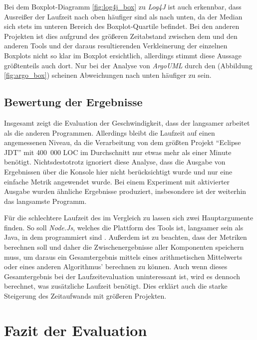 Bei dem Boxplot-Diagramm \ref{fig:log4j_box} zu \textit{Log4J} ist auch erkennbar, dass Ausreißer der Laufzeit nach oben häufiger sind als nach unten, da der Median sich stets im unteren Bereich des Boxplot-Quartile befindet. Bei den anderen Projekten ist dies aufgrund des größeren Zeitabstand  zwischen dem \doceval und den anderen Tools  und der daraus resultierenden Verkleinerung der einzelnen Boxplots  nicht so klar im Boxplot ersichtlich, allerdings stimmt diese Aussage größtenteils auch dort. Nur bei der Analyse von \textit{ArgoUML} durch den \doceval (Abbildung \ref{fig:argo_box}) scheinen Abweichungen nach unten häufiger zu sein.

\subsection{Bewertung der Ergebnisse}
Insgesamt zeigt die Evaluation der Geschwindigkeit, dass der \doceval langsamer arbeitet als die anderen Programmen. Allerdings  bleibt die Laufzeit auf einen angemessenen Niveau, da die Verarbeitung von dem größten Projekt \enquote{Eclipse \ac{JDT}} mit 400~000 \ac{LOC} im Durchschnitt nur etwas mehr als einer Minute benötigt. Nichtsdestotrotz ignoriert diese Analyse, dass die Ausgabe von Ergebnissen über die Konsole hier nicht berücksichtigt wurde und nur eine einfache Metrik angewendet wurde. Bei einem Experiment mit aktivierter Ausgabe wurden ähnliche Ergebnisse produziert, insbesondere ist der \doceval weiterhin das langsamste Programm. 

Für die schlechtere Laufzeit des \doceval im Vergleich zu \checkpmd lassen sich zwei Hauptargumente finden. So soll \textit{Node.Js}, welches die Plattform des Tools ist, langsamer sein als Java, in dem \checkpmd programmiert sind \cite{node_java_speed}.  Außerdem ist zu beachten, dass der \doceval Metriken berechnen soll und daher die Zwischenergebnisse aller Komponenten speichern muss, um daraus ein Gesamtergebnis mittels eines arithmetischen Mittelwerts oder eines anderen Algorithmus' berechnen zu können. Auch wenn dieses Gesamtergebnis bei der Laufzeitevaluation uninteressant ist, wird es dennoch berechnet, was zusätzliche Laufzeit benötigt. Dies erklärt auch die starke Steigerung des Zeitaufwands mit größeren Projekten.

\section{Fazit der Evaluation}\label{chapter:eval_conclusion}

